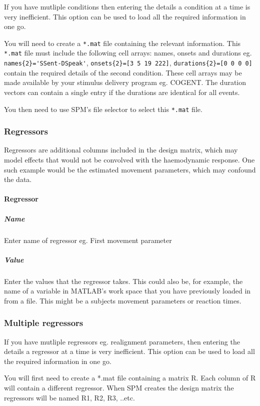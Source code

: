 If you have mutliple conditions then entering the details a condition 
at a time is very inefficient. This option can be used to load all the 
required information in one go. 

You will need to create a \verb!*.mat! file 
containing the relevant information. 
This \verb!*.mat! file must include the following cell arrays: names, onsets and durations 
eg. \verb!names{2}='SSent-DSpeak'!, 
\verb!onsets{2}=[3 5 19 222]!, \verb!durations{2}=[0 0 0 0]! contain the required details of the second condition. These cell arrays may be made available 
by your stimulus delivery program eg. COGENT. The duration vectors can 
contain a single entry if the durations are identical for all events. 

You then need to use SPM's file selector to select this
\verb!*.mat! file.

\subsubsection{Regressors}
Regressors are additional columns included in the design matrix, which may model effects that would not be convolved with the haemodynamic response.  One such example would be the estimated movement parameters, which may confound the data.


\paragraph{Regressor}


\subparagraph{Name}
Enter name of regressor eg. First movement parameter


\subparagraph{Value}
Enter the values that the regressor takes. This could also be, for example, the name of a variable in MATLAB's work space that you 
have previously loaded in from a file. This might be a subjects
movement parameters or reaction times.

\subsubsection{Multiple regressors}

If you have mutliple regressors eg. realignment parameters, then entering the details a regressor at a time is very inefficient. 
This option can be used to load all the 
required information in one go. 

You will first need to create a *.mat file 
containing a matrix R. Each column of R will contain a different regressor. When SPM creates the design matrix the regressors will be named R1, R2, R3, ..etc.

